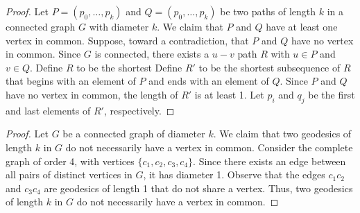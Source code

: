 \documentclass[12pt]{article}
\begin{document}
\begin{proof}
    Let $P=(p_0, \hdots, p_k)$ and $Q=(p_0, \hdots, p_k)$ be two paths of length $k$ in a connected graph $G$ with diameter $k$.
    We claim that $P$ and $Q$ have at least one vertex in common.
    Suppose, toward a contradiction, that $P$ and $Q$ have no vertex in common.
    Since $G$ is connected, there exists a $u-v$ path $R$ with $u \in P$ and $v \in Q$.
    Define $R$ to be the shortest 
    Define $R'$ to be the shortest subsequence of $R$ that begins with an element of $P$ and ends with an element of $Q$.
    Since $P$ and $Q$ have no vertex in common, the length of $R'$ is at least 1.
    Let $p_i$ and $q_j$ be the first and last elements of $R'$, respectively.
\end{proof}

\medskip
{}
\begin{proof}
    Let $G$ be a connected graph of diameter $k$.
    We claim that two geodesics of length $k$ in $G$ do not necessarily have a vertex in common.
    Consider the complete graph of order 4, with vertices $\{c_1, c_2, c_3, c_4\}$.
    Since there exists an edge between all pairs of distinct vertices in $G$, it has diameter 1.
    Observe that the edges $c_1c_2$ and $c_3c_4$ are geodesics of length 1 that do not share a vertex.
    Thus, two geodesics of length $k$ in $G$ do not necessarily have a vertex in common.
\end{proof}

\bigskip
{}
\end{document}

